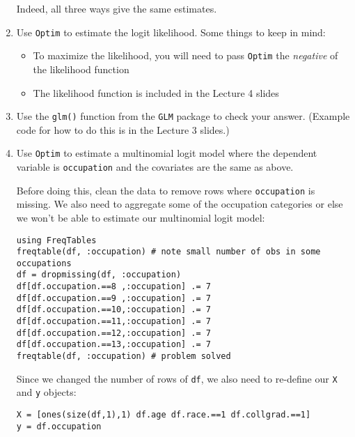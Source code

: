 \documentclass[12pt,english]{article}
\begin{document}
\begin{enumerate}
Indeed, all three ways give the same estimates.

\item Use \texttt{Optim} to estimate the logit likelihood. Some things to keep in mind:
\begin{itemize}
    \item To maximize the likelihood, you will need to pass \texttt{Optim} the \textit{negative} of the likelihood function
    \item The likelihood function is included in the Lecture 4 slides
\end{itemize}

\item Use the \texttt{glm()} function from the \texttt{GLM} package to check your answer. (Example code for how to do this is in the Lecture 3 slides.)


\item Use \texttt{Optim} to estimate a multinomial logit model where the dependent variable is \texttt{occupation} and the covariates are the same as above.

Before doing this, clean the data to remove rows where \texttt{occupation} is missing. We also need to aggregate some of the occupation categories or else we won't be able to estimate our multinomial logit model:

\begin{verbatim}
using FreqTables
freqtable(df, :occupation) # note small number of obs in some occupations
df = dropmissing(df, :occupation)
df[df.occupation.==8 ,:occupation] .= 7
df[df.occupation.==9 ,:occupation] .= 7
df[df.occupation.==10,:occupation] .= 7
df[df.occupation.==11,:occupation] .= 7
df[df.occupation.==12,:occupation] .= 7
df[df.occupation.==13,:occupation] .= 7
freqtable(df, :occupation) # problem solved
\end{verbatim}

Since we changed the number of rows of \texttt{df}, we also need to re-define our \texttt{X} and \texttt{y} objects:
\begin{verbatim}
X = [ones(size(df,1),1) df.age df.race.==1 df.collgrad.==1]
y = df.occupation
\end{verbatim}


\end{enumerate}
\end{document}
